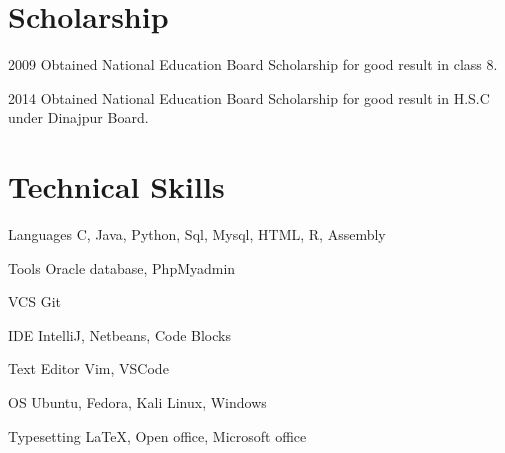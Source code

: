 \documentclass[a4paper]{article}
\begin{document}


\section{Scholarship}

\begin{CV}
\item[2009] Obtained National Education Board Scholarship for good result in class 8.
\item[2014] Obtained National Education Board Scholarship for good result in H.S.C under Dinajpur Board.
\end{CV}


\section{Technical Skills}

\begin{CV}
\item[Languages]  C, Java, Python, Sql, Mysql, HTML, R, Assembly
\item[Tools] Oracle database, PhpMyadmin
\item[VCS] Git
\item[IDE] IntelliJ, Netbeans, Code Blocks
\item[Text Editor] Vim, VSCode
\item[OS] Ubuntu, Fedora, Kali Linux, Windows
\item[Typesetting] \LaTeX{}, Open office, Microsoft office
\end{CV}
\end{document}
